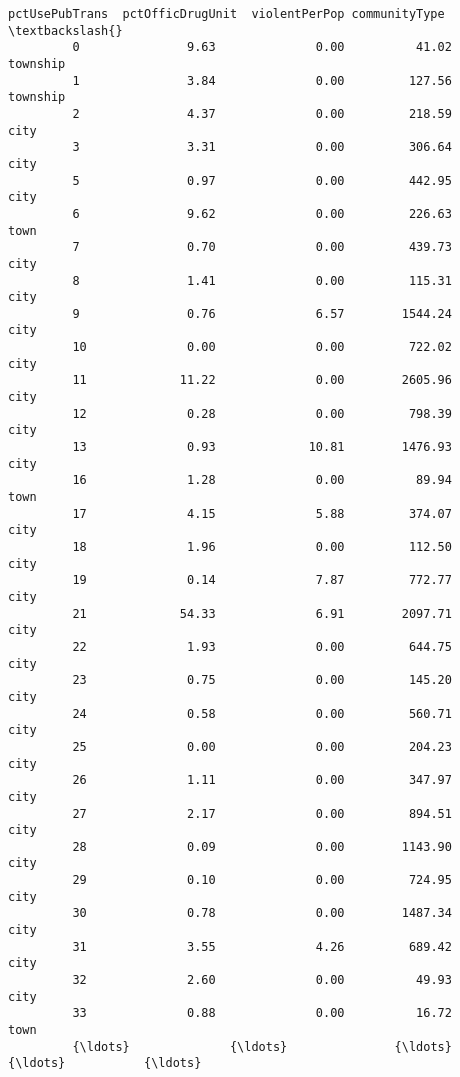 \documentclass[11pt]{llncs}
\begin{document}
\begin{Verbatim}[commandchars=\\\{\}]
               pctUsePubTrans  pctOfficDrugUnit  violentPerPop communityType  \textbackslash{}
         0               9.63              0.00          41.02      township   
         1               3.84              0.00         127.56      township   
         2               4.37              0.00         218.59          city   
         3               3.31              0.00         306.64          city   
         5               0.97              0.00         442.95          city   
         6               9.62              0.00         226.63          town   
         7               0.70              0.00         439.73          city   
         8               1.41              0.00         115.31          city   
         9               0.76              6.57        1544.24          city   
         10              0.00              0.00         722.02          city   
         11             11.22              0.00        2605.96          city   
         12              0.28              0.00         798.39          city   
         13              0.93             10.81        1476.93          city   
         16              1.28              0.00          89.94          town   
         17              4.15              5.88         374.07          city   
         18              1.96              0.00         112.50          city   
         19              0.14              7.87         772.77          city   
         21             54.33              6.91        2097.71          city   
         22              1.93              0.00         644.75          city   
         23              0.75              0.00         145.20          city   
         24              0.58              0.00         560.71          city   
         25              0.00              0.00         204.23          city   
         26              1.11              0.00         347.97          city   
         27              2.17              0.00         894.51          city   
         28              0.09              0.00        1143.90          city   
         29              0.10              0.00         724.95          city   
         30              0.78              0.00        1487.34          city   
         31              3.55              4.26         689.42          city   
         32              2.60              0.00          49.93          city   
         33              0.88              0.00          16.72          town   
         {\ldots}              {\ldots}               {\ldots}            {\ldots}           {\ldots}   

\end{Verbatim}
\end{document}
